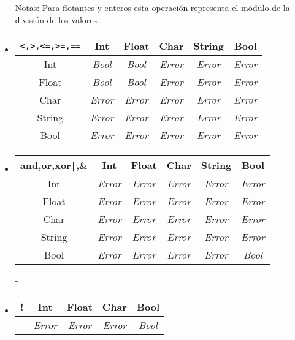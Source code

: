 \documentclass[12pt, spanish]{report}
\begin{document}
\begin{itemize}
Notas: Para flotantes y enteros esta operaci\'on representa el m\'odulo de la
divisi\'on de los valores.\\

\item
\begin{tabular}{|c||ccccc|}
	\hline
\texttt{<,>,<=,>=,==}&  Int  & Float & Char & String & Bool  \\
	\hline \hline
Int      &  \emph{Bool} &  \emph{Bool} & \emph{Error} & \emph{Error} & \emph{Error}\\
Float    &  \emph{Bool} &  \emph{Bool} & \emph{Error} & \emph{Error} & \emph{Error}\\
Char     & \emph{Error} & \emph{Error} & \emph{Error} & \emph{Error} & \emph{Error} \\
String   & \emph{Error} & \emph{Error} & \emph{Error} & \emph{Error} & \emph{Error} \\
Bool     & \emph{Error} & \emph{Error} & \emph{Error} & \emph{Error} & \emph{Error} \\
	\hline
\end{tabular}

\item
\begin{tabular}{|c||ccccc|}
	    \hline
and,or,xor\texttt{|},\& &  Int&    Float     &     Char     &     String   & Bool  \\
	    \hline \hline
Int         & \emph{Error} & \emph{Error} & \emph{Error} & \emph{Error} & \emph{Error} \\
Float       & \emph{Error} & \emph{Error} & \emph{Error} & \emph{Error} & \emph{Error} \\
Char        & \emph{Error} & \emph{Error} & \emph{Error} & \emph{Error} & \emph{Error} \\
String      & \emph{Error} & \emph{Error} & \emph{Error} & \emph{Error} & \emph{Error} \\
Bool        & \emph{Error} & \emph{Error} & \emph{Error} & \emph{Error} & \emph{Bool} \\
	\hline
\end{tabular}
-
\item
\begin{tabular}{|c||cccc|}
 \hline
!       &  Int  & Float & Char  & Bool  \\
 \hline \hline
        & \emph{Error} & \emph{Error} & \emph{Error} & \emph{Bool} \\
	\hline
\end{tabular}
\end{itemize}
\end{document}
